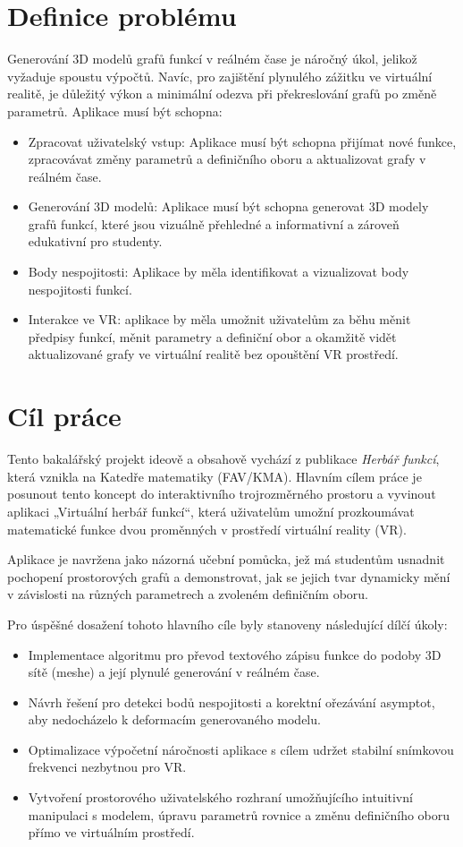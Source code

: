 \documentclass[czech, kiv, sem, he, iso690alph, pdf,viewonly]{fasthesis}
\begin{document}
\section{Definice problému}
Generování 3D modelů grafů funkcí v reálném čase je náročný úkol, jelikož vyžaduje spoustu výpočtů.
Navíc, pro zajištění plynulého zážitku ve virtuální realitě, je důležitý výkon a minimální odezva při překreslování grafů po změně parametrů.
Aplikace musí být schopna:
\begin{itemize}
    \item Zpracovat uživatelský vstup: Aplikace musí být schopna přijímat nové funkce, zpracovávat změny parametrů a definičního oboru a aktualizovat grafy v reálném čase.
    \item Generování 3D modelů: Aplikace musí být schopna generovat 3D modely grafů funkcí, které jsou vizuálně přehledné a informativní a zároveň edukativní pro studenty.
    \item Body nespojitosti: Aplikace by měla identifikovat a vizualizovat body nespojitosti funkcí.
    \item Interakce ve VR: aplikace by měla umožnit uživatelům za běhu měnit předpisy funkcí, měnit parametry a definiční obor a okamžitě vidět aktualizované grafy ve virtuální realitě bez opouštění VR prostředí.
\end{itemize}

\section{Cíl práce}
Tento bakalářský projekt ideově a obsahově vychází z publikace \textit{Herbář funkcí}, která vznikla na Katedře matematiky (FAV/KMA). 
Hlavním cílem práce je posunout tento koncept do interaktivního trojrozměrného prostoru a vyvinout aplikaci „Virtuální herbář funkcí“, 
která uživatelům umožní prozkoumávat matematické funkce dvou proměnných v prostředí virtuální reality (VR). 

Aplikace je navržena jako názorná učební pomůcka, jež má studentům usnadnit pochopení prostorových grafů a demonstrovat, 
jak se jejich tvar dynamicky mění v závislosti na různých parametrech a zvoleném definičním oboru.

Pro úspěšné dosažení tohoto hlavního cíle byly stanoveny následující dílčí úkoly:
\begin{itemize}
    \item Implementace algoritmu pro převod textového zápisu funkce do podoby 3D sítě (meshe) a její plynulé generování v reálném čase.
    \item Návrh řešení pro detekci bodů nespojitosti a korektní ořezávání asymptot, aby nedocházelo k deformacím generovaného modelu.
    \item Optimalizace výpočetní náročnosti aplikace s cílem udržet stabilní snímkovou frekvenci nezbytnou pro VR.
    \item Vytvoření prostorového uživatelského rozhraní umožňujícího intuitivní manipulaci s modelem, úpravu parametrů rovnice a změnu definičního oboru přímo ve virtuálním prostředí.
\end{itemize}
\end{document}
